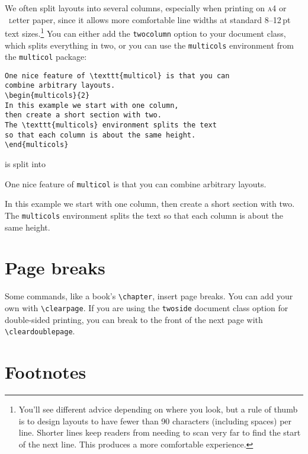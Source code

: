 We often split layouts into several columns, especially when printing on
\textsc{a4} or ~\textsc{l}etter paper,
since it allows more comfortable line widths at standard
8--12\,pt text sizes.\punckern\footnote{You'll see different advice depending
on where you look, but a rule of thumb is to design layouts to have
fewer than 90 characters (including spaces) per line.
Shorter lines keep readers from needing to scan very far to find the start of
the next line.
This produces a more comfortable experience.}
You can either add the \texttt{twocolumn} option to your document class,
which splits everything in two, or you can use the \texttt{multicols}
environment from the \texttt{multicol} package:
\begin{leftfigure}
\begin{lstlisting}
One nice feature of \texttt{multicol} is that you can
combine arbitrary layouts.
\begin{multicols}{2}
In this example we start with one column,
then create a short section with two.
The \texttt{multicols} environment splits the text
so that each column is about the same height.
\end{multicols}
\end{lstlisting}
\end{leftfigure}
is split into
\begin{leftfigure}
\lm%
One nice feature of \texttt{multicol} is that you can
combine arbitrary layouts.
\begin{multicols}{2}
In this example we start with one column,
then create a short section with two.
The \texttt{multicols} environment splits the text
so that each column is about the same height.
\end{multicols}
\end{leftfigure}

\section{Page breaks}

Some commands, like a book's \verb|\chapter|, insert page breaks.
You can add your own with \verb|\clearpage|.
If you are using the \texttt{twoside} document class option for double-sided
printing, you can break to the front of the next page with
\verb|\cleardoublepage|.

\section{Footnotes}

